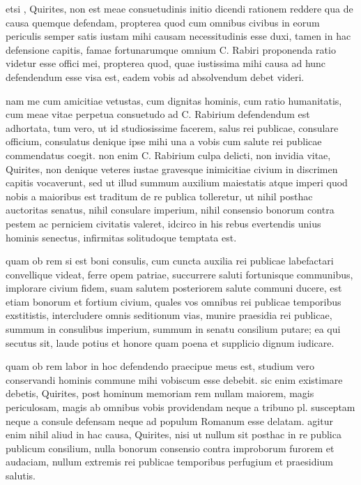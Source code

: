 
 etsi , Quirites, non est meae consuetudinis initio dicendi rationem reddere qua de causa quemque defendam, propterea quod cum omnibus civibus in eorum periculis semper satis iustam mihi causam necessitudinis esse duxi, tamen in hac defensione capitis, famae fortunarumque omnium C. Rabiri proponenda ratio videtur esse offici mei, propterea quod, quae iustissima mihi causa ad hunc defendendum esse visa est, eadem vobis ad absolvendum debet videri.

 nam me cum amicitiae vetustas, cum dignitas hominis, cum ratio humanitatis, cum meae vitae perpetua consuetudo ad C. Rabirium defendendum est adhortata, tum vero, ut id studiosissime facerem, salus rei publicae, consulare officium, consulatus denique ipse mihi una a vobis cum salute rei publicae commendatus coegit. non enim C. Rabirium culpa delicti, non invidia vitae, Quirites, non denique veteres iustae gravesque inimicitiae civium in discrimen capitis vocaverunt, sed ut illud summum auxilium maiestatis atque imperi quod nobis a maioribus est traditum de re publica tolleretur, ut nihil posthac auctoritas senatus, nihil consulare imperium, nihil consensio bonorum contra pestem ac perniciem civitatis valeret, idcirco in his rebus evertendis unius hominis senectus, infirmitas solitudoque temptata est.

 quam ob rem si est boni consulis, cum cuncta auxilia rei publicae labefactari convellique videat, ferre opem patriae, succurrere saluti fortunisque communibus, implorare civium fidem, suam salutem posteriorem salute communi ducere, est etiam bonorum et fortium civium, quales vos omnibus rei publicae temporibus exstitistis, intercludere omnis seditionum vias, munire praesidia rei publicae, summum in consulibus imperium, summum in senatu consilium putare; ea qui secutus sit, laude potius et honore quam poena et supplicio dignum iudicare.

 quam ob rem labor in hoc defendendo praecipue meus est, studium vero conservandi hominis commune mihi vobiscum esse debebit. sic enim existimare debetis, Quirites, post hominum memoriam rem nullam maiorem, magis periculosam, magis ab omnibus vobis providendam neque a tribuno pl. susceptam neque a consule defensam neque ad populum Romanum esse delatam. agitur enim nihil aliud in hac causa, Quirites, nisi ut nullum sit posthac in re publica publicum consilium, nulla bonorum consensio contra improborum furorem et audaciam, nullum extremis rei publicae temporibus perfugium et praesidium salutis.

